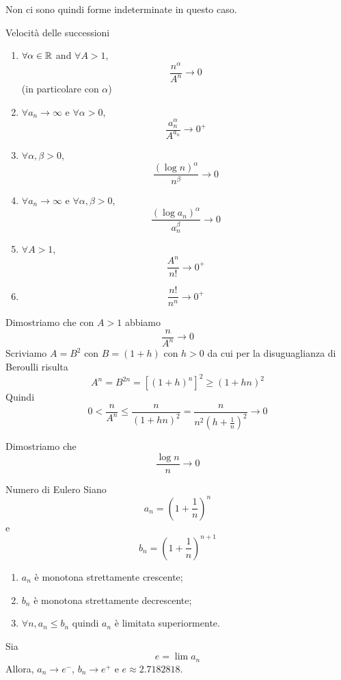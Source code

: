 \documentclass[a4paper]{article}
\begin{document}
Non ci sono quindi forme indeterminate in questo caso.

\begin{snippetproposition}{Velocità delle successioni}
    \begin{enumerate}
        \item \(\forall \alpha\in\mathbb{R}\) and \(\forall A>1\),
            \[ \frac{n^\alpha}{A^n} \to 0 \]
            (in particolare con \(\alpha\))
        \item \(\forall a_n \to \infty\) e \(\forall \alpha > 0\),
            \[ \frac{a_n^\alpha}{A^{a_n}} \to 0^+ \]
        \item \(\forall \alpha, \beta > 0\),
            \[
                \frac{{(\log n)}^\alpha}{n^\beta} \to 0
            \]
        \item \(\forall a_n \to \infty\) e \(\forall \alpha, \beta > 0\),
            \[
                \frac{{(\log a_n)}^\alpha}{a_n^\beta} \to 0
            \]
        \item \(\forall A > 1\),
            \[
                \frac{A^n}{n!} \to 0^+
            \]
        \item
            \[
                \frac{n!}{n^n} \to 0^+
            \]
    \end{enumerate}
\end{snippetproposition}

\begin{snippetproof}{}
    Dimostriamo che con \(A > 1\) abbiamo
    \[
        \frac{n}{A^n} \to 0
    \]
    Scriviamo \(A=B^2\) con \(B=(1+h)\) con \(h>0\) da cui per la disuguaglianza di Beroulli
    risulta
    \[
        A^n = B^{2n} = {\left[{(1+h)}^n\right]}^2 \geq {(1+hn)}^2
    \]
    Quindi
    \[
        0 < \frac{n}{A^n} \leq \frac{n}{{(1+hn)}^2} = \frac{n}{n^2{(h+\frac{1}{n})}^2} \to 0
    \]
\end{snippetproof}

\begin{snippetproof}{}
    Dimostriamo che 
    \[
        \frac{\log n}{n} \to 0
    \]
\end{snippetproof}

\pagebreak

\begin{snippettheorem}{Numero di Eulero}
    Siano
    \[
        a_n = {\left(1 + \frac{1}{n}\right)}^n
    \]
    e
    \[
        b_n = {\left(1 + \frac{1}{n}\right)}^{n+1}
    \]
    \begin{enumerate}
        \item \(a_n\) è monotona strettamente crescente;
        \item \(b_n\) è monotona strettamente decrescente;
        \item \(\forall n, a_n \leq b_n\) quindi \(a_n\) è limitata superiormente.
    \end{enumerate}
    Sia \[
        e = \lim a_n
    \]
    Allora, \(a_n \to e^-\), \(b_n \to e^+\)
    e \(e \approx 2.7182818\).
\end{snippettheorem}
\end{document}
